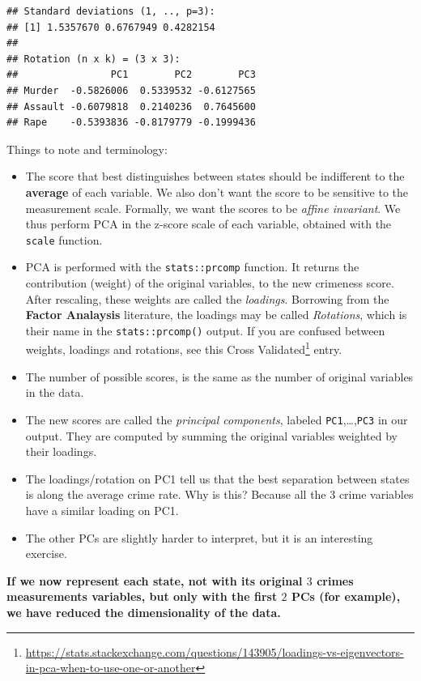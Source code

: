 \documentclass[]{book}
\renewcommand{\href}[2]{#2\footnote{\url{#1}}}
\theoremstyle{definition}
\theoremstyle{definition}
\theoremstyle{definition}
\theoremstyle{remark}
\begin{document}
\begin{verbatim}
## Standard deviations (1, .., p=3):
## [1] 1.5357670 0.6767949 0.4282154
## 
## Rotation (n x k) = (3 x 3):
##                PC1        PC2        PC3
## Murder  -0.5826006  0.5339532 -0.6127565
## Assault -0.6079818  0.2140236  0.7645600
## Rape    -0.5393836 -0.8179779 -0.1999436
\end{verbatim}

Things to note and terminology:

\begin{itemize}
\item
  The score that best distinguishes between states should be indifferent to the \textbf{average} of each variable.
  We also don't want the score to be sensitive to the measurement scale.
  Formally, we want the scores to be \emph{affine invariant}.
  We thus perform PCA in the z-score scale of each variable, obtained with the \texttt{scale} function.
\item
  PCA is performed with the \texttt{stats::prcomp} function.
  It returns the contribution (weight) of the original variables, to the new crimeness score. After rescaling, these weights are called the \emph{loadings}.
  Borrowing from the \textbf{Factor Analaysis} literature, the loadings may be called \emph{Rotations}, which is their name in the \texttt{stats::prcomp()} output. If you are confused between weights, loadings and rotations, see this \href{https://stats.stackexchange.com/questions/143905/loadings-vs-eigenvectors-in-pca-when-to-use-one-or-another}{Cross Validated} entry.
\item
  The number of possible scores, is the same as the number of original variables in the data.
\item
  The new scores are called the \emph{principal components}, labeled \texttt{PC1},\ldots{},\texttt{PC3} in our output. They are computed by summing the original variables weighted by their loadings.
\item
  The loadings/rotation on PC1 tell us that the best separation between states is along the average crime rate.
  Why is this?
  Because all the \(3\) crime variables have a similar loading on PC1.
\item
  The other PCs are slightly harder to interpret, but it is an interesting exercise.
\end{itemize}

\textbf{If we now represent each state, not with its original \(3\) crimes measurements variables, but only with the first \(2\) PCs (for example), we have reduced the dimensionality of the data.}
\end{document}
